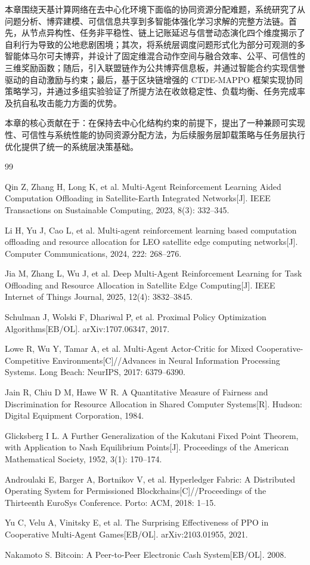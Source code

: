 \documentclass[UTF8,12pt,oneside]{ctexbook}
\begin{document}
本章围绕天基计算网络在去中心化环境下面临的协同资源分配难题，系统研究了从问题分析、博弈建模、可信信息共享到多智能体强化学习求解的完整方法链。首先，从节点异构性、任务非平稳性、链上记账延迟与信誉动态演化四个维度揭示了自利行为导致的公地悲剧困境；其次，将系统层调度问题形式化为部分可观测的多智能体马尔可夫博弈，并设计了固定维混合动作空间与融合效率、公平、可信性的三维奖励函数；随后，引入联盟链作为公共博弈信息板，并通过智能合约实现信誉驱动的自动激励与约束；最后，基于区块链增强的 CTDE-MAPPO 框架实现协同策略学习，并通过多组实验验证了所提方法在收敛稳定性、负载均衡、任务完成率及抗自私攻击能力方面的优势。

本章的核心贡献在于：在保持去中心化结构约束的前提下，提出了一种兼顾可实现性、可信性与系统性能的协同资源分配方法，为后续服务层卸载策略与任务层执行优化提供了统一的系统层决策基础。

{\small
\begin{thebibliography}{99}

Qin Z, Zhang H, Long K, et al.
Multi-Agent Reinforcement Learning Aided Computation Offloading in Satellite-Earth Integrated Networks[J].
IEEE Transactions on Sustainable Computing, 2023, 8(3): 332--345.

Li H, Yu J, Cao L, et al.
Multi-agent reinforcement learning based computation offloading and resource allocation for LEO satellite edge computing networks[J].
Computer Communications, 2024, 222: 268--276.

Jia M, Zhang L, Wu J, et al.
Deep Multi-Agent Reinforcement Learning for Task Offloading and Resource Allocation in Satellite Edge Computing[J].
IEEE Internet of Things Journal, 2025, 12(4): 3832--3845.

Schulman J, Wolski F, Dhariwal P, et al.
Proximal Policy Optimization Algorithms[EB/OL].
arXiv:1707.06347, 2017.

Lowe R, Wu Y, Tamar A, et al.
Multi-Agent Actor-Critic for Mixed Cooperative-Competitive Environments[C]//Advances in Neural Information Processing Systems.
Long Beach: NeurIPS, 2017: 6379--6390.

Jain R, Chiu D M, Hawe W R.
A Quantitative Measure of Fairness and Discrimination for Resource Allocation in Shared Computer Systems[R].
Hudson: Digital Equipment Corporation, 1984.

Glicksberg I L.
A Further Generalization of the Kakutani Fixed Point Theorem, with Application to Nash Equilibrium Points[J].
Proceedings of the American Mathematical Society, 1952, 3(1): 170--174.

Androulaki E, Barger A, Bortnikov V, et al.
Hyperledger Fabric: A Distributed Operating System for Permissioned Blockchains[C]//Proceedings of the Thirteenth EuroSys Conference.
Porto: ACM, 2018: 1--15.

Yu C, Velu A, Vinitsky E, et al.
The Surprising Effectiveness of PPO in Cooperative Multi-Agent Games[EB/OL].
arXiv:2103.01955, 2021.

Nakamoto S.
Bitcoin: A Peer-to-Peer Electronic Cash System[EB/OL].
2008.

\end{thebibliography}
}
\end{document}
